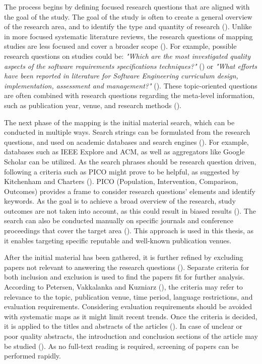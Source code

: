 The process begins by defining focused research questions that are aligned with
the goal of the study. The goal of the study is often to create a general
overview of the research area, and to identify the type and quantity of research
(\cite{petersen2008}). Unlike in more focused systematic literature reviews, the
research questions of mapping studies are less focused and cover a broader scope
(\cite{kitchenham2010}). For example, possible research questions on studies
could be: \emph{"Which are the most investigated quality aspects of the software
  requirements specifications techniques?"} (\cite{condori2009}) or \emph{"What
  efforts have been reported in literature for Software Engineering curriculum
  design, implementation, assessment and management?"} (\cite{qadir2011}). These
topic-oriented questions are often combined with research questions regarding
the meta-level information, such as publication year, venue, and research
methods (\cite{petersen2015}).

The next phase of the mapping is the initial material search, which can be
conducted in multiple ways. Search strings can be formulated from the research
questions, and used on academic databases and search engines
(\cite{petersen2008}). For example, databases such as IEEE Explore and ACM, as
well as aggregators like Google Scholar can be utilized. As the search phrases
should be research question driven, following a criteria such as PICO might
prove to be helpful, as suggested by Kitchenham and Charters
(\cite*{kitchenham2007}). PICO (Population, Intervention, Comparison, Outcomes)
provides a frame to consider research questions' elements and identify keywords.
As the goal is to achieve a broad overview of the research, study outcomes are
not taken into account, as this could result in biased results
(\cite{petersen2008}). The search can also be conducted manually on specific
journals and conference proceedings that cover the target area
(\cite{petersen2008}). This approach is used in this thesis, as it enables
targeting specific reputable and well-known publication venues.

After the initial material has been gathered, it is further refined by excluding
papers not relevant to answering the research questions (\cite{petersen2008}).
Separate criteria for both inclusion and exclusion is used to find the papers
fit for further analysis. According to Petersen, Vakkalanka and Kuzniarz
(\cite*{petersen2015}), the criteria may refer to relevance to the topic,
publication venue, time period, language restrictions, and evaluation
requirements. Considering evaluation requirements should be avoided with
systematic maps as it might limit recent trends. Once the criteria is decided,
it is applied to the titles and abstracts of the articles (\cite{petersen2015}).
In case of unclear or poor quality abstracts, the introduction and conclusion
sections of the article may be studied (\cite{petersen2008}). As no full-text
reading is required, screening of papers can be performed rapidly.

